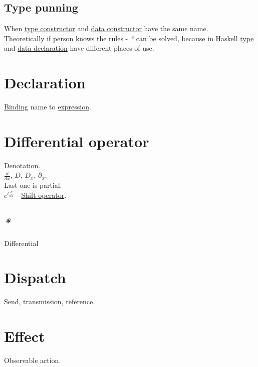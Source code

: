 \documentclass[a4paper,14pt,oneside]{book}
\begin{document}
\section{\label{org36aefcd}Type punning}
\label{sec:orgcf23b6f}
When \hyperref[org38dd8de]{type constructor} and \hyperref[org0c8477a]{data constructor} have the same name.\\

Theoretically if person knows the rules - \emph{*} can be solved, because in Haskell \hyperref[orgdbcea73]{type} and \hyperref[org2962659]{data declaration} have different places of use.\\

\chapter{\label{org1113171}Declaration}
\label{sec:org6a84532}
\hyperref[org73123b0]{Binding} name to \hyperref[org4eaaefd]{expression}.\\

\chapter{\label{org0e57b9d}Differential operator}
\label{sec:org363a330}
Denotation.\\
\(\frac{d}{dx}, \, D, \, D_{x}, \, \partial_{x}.\)\\
Last one is partial.\\

\(e^{t{\frac{d}{dx}}}\) - \hyperref[org303a0e6]{Shift operator}.\\

\section{\emph{*}}
\label{sec:orgbaaf849}

\label{org9da3fe7}Differential\\

\chapter{\label{org749fc82}Dispatch}
\label{sec:org1abc59b}
Send, transmission, reference.\\

\chapter{\label{org7897fca}Effect}
\label{sec:orgae11b14}
Observable action.\\
\end{document}

